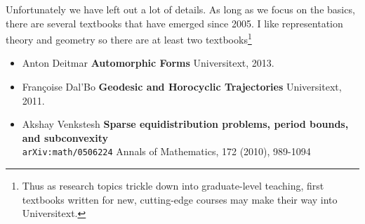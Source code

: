 \documentclass[12pt]{article}
\begin{document}
Unfortunately we have left out a lot of details.  As long as we focus on the basics, there are several textbooks that have emerged since 2005.  I like representation theory and geometry so there are at least two textbooks\footnote{Thus as research topics trickle down into graduate-level teaching, first textbooks written for new, cutting-edge courses may make their way into Universitext.}
\begin{itemize}
\item Anton Deitmar \textbf{Automorphic Forms} Universitext, 2013.
\item Françoise Dal'Bo  \textbf{Geodesic and Horocyclic Trajectories} Universitext, 2011.
\item Akshay Venkstesh \textbf{Sparse equidistribution problems, period bounds, and subconvexity} \\ \texttt{arXiv:math/0506224} Annals of Mathematics, 172 (2010), 989-1094
\end{itemize}

\newpage
\end{document}

